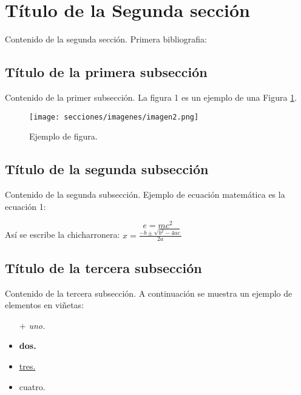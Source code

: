 \section{Título de la Segunda sección}
Contenido de la segunda sección. Primera bibliografia:\cite{bib2}


\subsection{Título de la primera subsección}
Contenido de la primer subsección. La figura 1 es un ejemplo de una Figura \ref{imagen2}.

\begin{figure}[h] %
    \begin{center}
        \texttt{[image: secciones/imagenes/imagen2.png]}
    \end{center}
    \caption{Ejemplo de figura. \label{imagen2}}
\end{figure}

\subsection{Título de la segunda subsección}
Contenido de la segunda subsección. Ejemplo de ecuación matemática es la ecuación 1:

\begin{equation}
    e=mc^2
    \label{ecuacion}
\end{equation}
Así se escribe la chicharronera: $x = \frac {-b \pm \sqrt {b^2 - 4ac}}{2a}$ 

\subsection{Título de la tercera subsección}
Contenido de la tercera subsección. A continuación se muestra un ejemplo de elementos en viñetas:

\begin{itemize} %
    \item [+]\textit{uno.}
    \item \textbf{dos.}
    \item \underline{tres.}
    \item cuatro.
\end{itemize}


